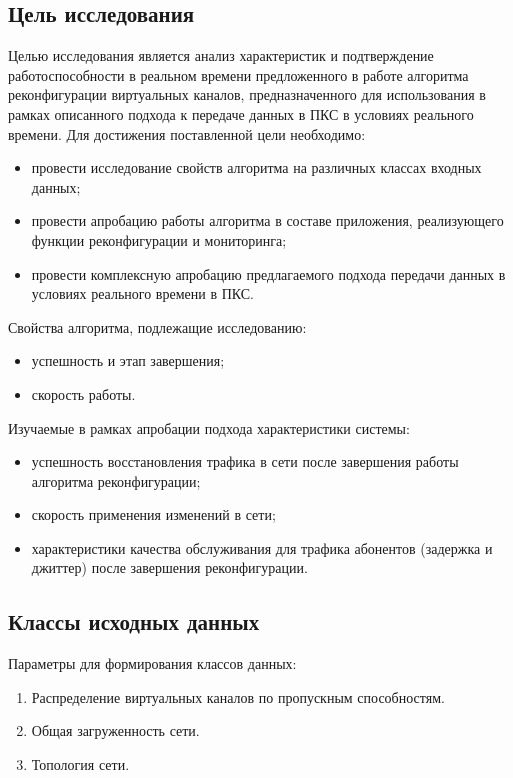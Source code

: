 \documentclass[12pt, a4paper]{article}
\begin{document}
\subsection{Цель исследования}
Целью исследования является анализ характеристик и подтверждение работоспособности в реальном времени предложенного в работе алгоритма реконфигурации виртуальных каналов, предназначенного для использования в рамках описанного подхода к передаче данных в ПКС в условиях реального времени. Для достижения поставленной цели необходимо:
\begin{itemize}
	\item провести исследование свойств алгоритма на различных классах входных данных; 
	\item провести апробацию работы алгоритма в составе приложения, реализующего функции реконфигурации и мониторинга;
	\item провести комплексную апробацию предлагаемого подхода передачи данных в условиях реального времени в ПКС.
\end{itemize}

Свойства алгоритма, подлежащие исследованию:
\begin{itemize}
	\item успешность и этап завершения;
	\item скорость работы.
\end{itemize}

Изучаемые в рамках апробации подхода характеристики системы:
\begin{itemize}
	\item успешность восстановления трафика в сети после завершения работы алгоритма реконфигурации;
	\item скорость применения изменений в сети;
	\item характеристики качества обслуживания для трафика абонентов (задержка и джиттер) после завершения реконфигурации.
\end{itemize}

\subsection{Классы исходных данных}
Параметры для формирования классов данных:
\begin{enumerate}
	\item Распределение виртуальных каналов по пропускным способностям.
	\item Общая загруженность сети.
	\item Топология сети.
\end{enumerate}
\end{document}
